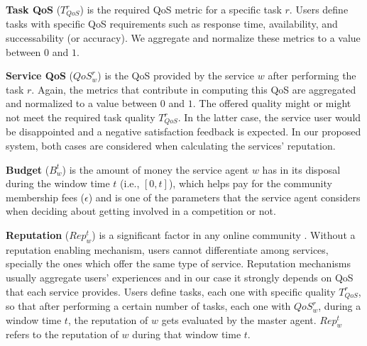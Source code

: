 \textbf{Task QoS} ($T_{QoS}^r$) is the required QoS metric for a
specific task $r$. Users define tasks with specific QoS
requirements such as response time, availability, and
successability (or accuracy). We aggregate and
normalize these metrics to a value between $0$
and $1$. %

\textbf{Service QoS} ($QoS_w^r$) is the QoS provided by the
service $w$ after performing the task $r$. Again, the metrics that
contribute in computing this QoS are aggregated and normalized to
a value between $0$ and $1$. The offered quality might or might
not meet the required task quality $T_{QoS}^r$. In the latter
case, the service user would be disappointed and a negative
satisfaction feedback is expected. In our proposed system, both
cases are considered when calculating the services' reputation.


\textbf{Budget} ($B_w^t$) is the amount of money the service agent
$w$ has in its disposal during the window time $t$ (i.e.,
$[0,t]$), which helps pay for the community membership fees
($\epsilon$) and is one of the parameters that the service agent
considers when deciding about getting involved in a competition or
not.

\textbf{Reputation} ($Rep_w^t$) is a significant factor in any
online community \cite{Fouss:2010:PRM:1751668.1751727}. Without a reputation enabling
mechanism, users cannot differentiate among services, specially
the ones which offer the same type of service. Reputation
mechanisms usually aggregate users' experiences and in our case it
strongly depends on QoS that each service provides. Users define
tasks, each one with specific quality $T_{QoS}^r$, so that after
performing a certain number of tasks, each one with $QoS_w^r$,
during a window time $t$, the reputation of $w$ gets evaluated by
the master agent. $Rep_{w}^{t}$ refers to the reputation of $w$
during that window time $t$.

